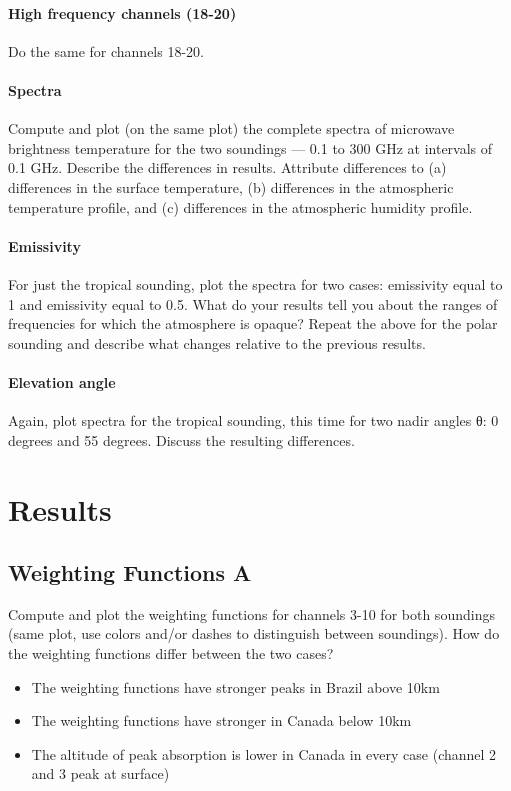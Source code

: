 \documentclass[twocol]{ametsoc}
\begin{document}
\paragraph{High frequency channels (18-20)}
Do the same for channels 18-20.

\paragraph{Spectra}
Compute and plot (on the same plot) the complete spectra of microwave brightness temperature for the two soundings — 0.1 to 300 GHz at intervals of 0.1 GHz.   Describe the differences in results. 
Attribute differences to (a) differences in the surface temperature, (b) differences in the atmospheric temperature profile, and (c) differences in the atmospheric humidity profile.

\paragraph{Emissivity}
For just the tropical sounding, plot the spectra for two cases:  emissivity equal to 1  and emissivity equal to 0.5.  What do your results tell you about the ranges of frequencies for which the atmosphere is opaque?
Repeat the above for the polar sounding and describe what changes relative to the previous results.

\paragraph{Elevation angle}
Again, plot spectra for the tropical sounding, this time for two nadir angles θ:  0 degrees and 55 degrees.  Discuss the resulting differences.

\section{Results}

\subsection{Weighting Functions A}
Compute and plot the weighting functions for channels 3-10 for both soundings (same plot, use colors and/or dashes to distinguish between soundings).  How do the weighting functions differ between the two cases?

\begin{itemize}
\item The weighting functions have stronger peaks in Brazil above 10km
\item The weighting functions have stronger in Canada below 10km
\item The altitude of peak absorption is lower in Canada in every case (channel 2 and 3 peak at surface)
\end{itemize}
\end{document}
